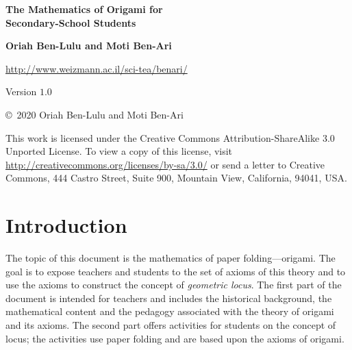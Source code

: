 
\thispagestyle{empty}

\begin{center}
\textbf{\LARGE The Mathematics of Origami for\\\medskip Secondary-School Students}

\bigskip
\bigskip

\textbf{\Large Oriah Ben-Lulu  and Moti Ben-Ari}

\bigskip
\bigskip

\url{http://www.weizmann.ac.il/sci-tea/benari/}

\bigskip
\bigskip

Version $1.0$
\end{center}

\vfill

\begin{small}
\begin{center}
\copyright{}\ 2020 Oriah Ben-Lulu and Moti Ben-Ari
\end{center}

This work is licensed under the Creative Commons Attribution-ShareAlike 3.0 Unported License. To view a copy of this license, visit \url{http://creativecommons.org/licenses/by-sa/3.0/} or send a letter to Creative Commons, 444 Castro Street, Suite 900, Mountain View, California, 94041, USA.
\end{small}

\newpage

\tableofcontents
\newpage


\section{Introduction}

The topic of this document is the mathematics of paper folding---origami. The goal is to expose teachers and students to the set of axioms of this theory and to use the axioms to construct the concept of \emph{geometric locus}. The first part of the document is intended for teachers and includes the historical background, the mathematical content and the pedagogy associated with the theory of origami and its axioms. The second part offers activities for students on the concept of locus; the activities use paper folding and are based upon the axioms of origami.


